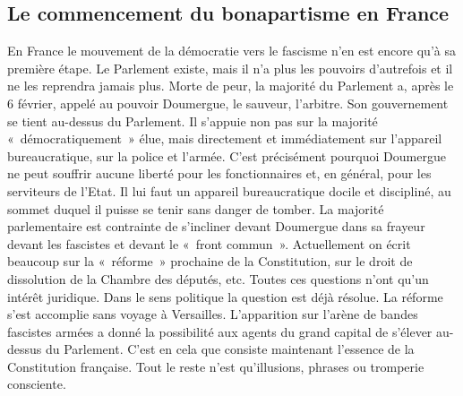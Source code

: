 \documentclass[french,twoside]{book} %
\begin{document}
\subsection[{Le commencement du bonapartisme en France}]{Le commencement du bonapartisme en France}
\noindent En France le mouvement de la démocratie vers le fascisme n’en est encore qu’à sa première étape. Le Parlement existe, mais il n’a plus les pouvoirs d’autrefois et il  ne les reprendra jamais plus. Morte de peur, la majorité du Parlement a, après le 6 février, appelé au pouvoir Doumergue, le sauveur, l’arbitre. Son gouvernement se tient au-dessus du Parlement. Il s’appuie non pas sur la majorité « démocratiquement » élue, mais directement et immédiatement sur l’appareil bureaucratique, sur la police et l’armée. C’est précisément pourquoi Doumergue ne peut souffrir aucune liberté pour les fonctionnaires et, en général, pour les serviteurs de l’Etat. Il lui faut un appareil bureaucratique docile et discipliné, au sommet duquel il puisse se tenir sans danger de tomber. La majorité parlementaire est contrainte de s’incliner devant Doumergue dans sa frayeur devant les fascistes et devant le « front commun ». Actuellement on écrit beaucoup sur la « réforme » prochaine de la Constitution, sur le droit de dissolution de la Chambre des députés, etc. Toutes ces questions n’ont qu’un intérêt juridique. Dans le sens politique la question est déjà résolue. La réforme s’est accomplie sans voyage à Versailles. L’apparition sur l’arène de bandes fascistes armées a donné la possibilité aux agents du grand capital de s’élever au-dessus du Parlement. C’est en cela que consiste maintenant l’essence de la Constitution française. Tout le reste n’est qu’illusions, phrases ou tromperie consciente.\par
\end{document}

